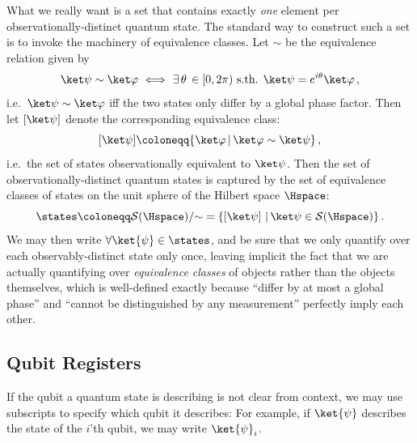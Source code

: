       What we really want is a set that contains exactly \emph{one} element 
        per observationally-distinct quantum state.
        The standard way to construct such a set is to invoke the 
        machinery of equivalence classes. Let $\sim$ be the equivalence relation
        given by 
      \[
        \ket\psi \sim \ket\varphi\ \Longleftrightarrow\ 
        \exists\, {\theta\, \in[0,2\pi)} \text{ s.th. } \ket\psi = e^{i\theta} \ket\varphi\, ,
      \]
      i.e.\ $\ket\psi \sim \ket\varphi$ iff the two states only differ by a
      global phase factor. Then let $[\ket\psi]$ denote the corresponding
      equivalence class:
      \[
        [\ket\psi] \coloneqq \{ \ket\varphi\, |\, \ket\varphi \sim \ket\psi \}\, ,
      \]
      i.e.\ the set of states observationally equivalent to $\ket\psi$.
      Then the set of observationally-distinct quantum states is captured by the set of
      equivalence classes of states on the unit sphere of the Hilbert space $\Hspace$:
      \[
        \states \coloneqq \mathcal{S}(\Hspace)/{\sim} = \{[\ket\psi]\ |\,
        \ket\psi \in \mathcal{S}(\Hspace) \}\, .
      \]
      We may then write $\forall \ket{\psi} \in \states$, and be sure that we
        only quantify over each observably-distinct state only once,
        leaving implicit the fact that we are
        actually quantifying over \emph{equivalence classes} of objects rather
        than the objects themselves, which is well-defined
        exactly because ``differ by at most a global phase'' and
        ``cannot be distinguished by any measurement'' perfectly imply each other.

  \subsection{Qubit Registers}
    If the qubit a quantum state is describing is not clear from context,
      we may use subscripts to specify which qubit it describes: 
      For example, if $\ket{\psi}$ describes the state of the $i$'th qubit,
      we may write $\ket{\psi}_i$. 

